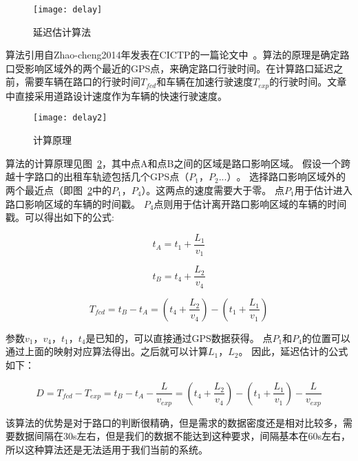 \begin{figure}[H] 
  \centering
  \texttt{[image: delay]}
  \caption{延迟估计算法}
  \label{fig:4}
\end{figure}

算法引用自Zhao-cheng2014年发表在CICTP的一篇论文中~\cite{he2014delay}。算法的原理是确定路口受影响区域外的两个最近的GPS点，来确定路口行驶时间。在计算路口延迟之前，需要车辆在路口的行驶时间$T_{fcd}$和车辆在加速行驶速度$T_{exp}$的行驶时间。文章中直接采用道路设计速度作为车辆的快速行驶速度。

\begin{figure}[H] 
  \centering
  \texttt{[image: delay2]}
  \caption{计算原理}
  \label{fig:5}
\end{figure}

算法的计算原理见图~\ref{fig:5}，其中点A和点B之间的区域是路口影响区域。 假设一个跨越十字路口的出租车轨迹包括几个GPS点$（P_{1}，P_{2} ...）$。 选择路口影响区域外的两个最近点（即图~\ref{fig:5}中的$P_{1}$，$P_{4}$）。这两点的速度需要大于零。 点$P_{1}$用于估计进入路口影响区域的车辆的时间戳。 $P_{4}$点则用于估计离开路口影响区域的车辆的时间戳。可以得出如下的公式:

\begin{equation}
t_{A}=t_{1}+\frac{L_{1}}{v_{1}}
\end{equation}

\begin{equation}
t_{B}=t_{4}+\frac{L_{2}}{v_{4}}
\end{equation}

\begin{equation}
T_{fcd}=t_{B}-t_{A}= \left( t_{4}+\frac{L_{2}}{v_{4}}\right) - \left( t_{1}+\frac{L_{1}}{v_{1}}\right)
\end{equation}

参数$v_{1}$，$v_{4}$，$t_{1}$，$t_{4}$是已知的，可以直接通过GPS数据获得。 点$P_{1} $和$P_{4}$的位置可以通过上面的映射对应算法得出。之后就可以计算$L_{1}$，$L_{2}$。 因此，延迟估计的公式如下：

\begin{equation}
D = T_{fcd} - T_{exp} = t_{B} - t_{A} - \frac{L}{v_{exp}}
= \left( t_{4}+\frac{L_{2}}{v_{4}}\right) - \left( t_{1}+\frac{L_{1}}{v_{1}}\right) - \frac{L}{v_{exp}}
\end{equation}

该算法的优势是对于路口的判断很精确，但是需求的数据密度还是相对比较多，需要数据间隔在30s左右，但是我们的数据不能达到这种要求，间隔基本在60s左右，所以这种算法还是无法适用于我们当前的系统。

